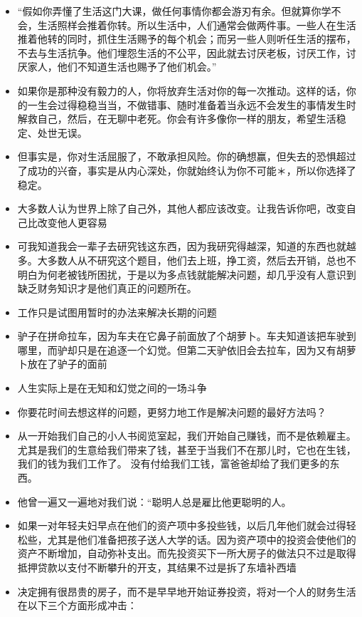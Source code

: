 \documentclass[UTF8,a4paper,8pt]{ctexbook}
\begin{document}
\begin{itemize}
			\item “假如你弄懂了生活这门大课，做任何事情你都会游刃有余。但就算你学不会，生活照样会推着你转。所以生活中，人们通常会做两件事。一些人在生活推着他转的同时，抓住生活赐予的每个机会；而另一些人则听任生活的摆布，不去与生活抗争。他们埋怨生活的不公平，因此就去讨厌老板，讨厌工作，讨厌家人，他们不知道生活也赐予了他们机会。”
			\item 如果你是那种没有毅力的人，你将放弃生活对你的每一次推动。这样的话，你的一生会过得稳稳当当，不做错事、随时准备着当永远不会发生的事情发生时解救自己，然后，在无聊中老死。你会有许多像你一样的朋友，希望生活稳定、处世无误。
			\item 但事实是，你对生活屈服了，不敢承担风险。你的确想赢，但失去的恐惧超过了成功的兴奋，事实是从内心深处，你就始终认为你不可能＊，所以你选择了稳定。
			\item 大多数人认为世界上除了自己外，其他人都应该改变。让我告诉你吧，改变自己比改变他人更容易
			\item 可我知道我会一辈子去研究钱这东西，因为我研究得越深，知道的东西也就越多。大多数人从不研究这个题目，他们去上班，挣工资，然后去开销，总也不明白为何老被钱所困扰，于是以为多点钱就能解决问题，却几乎没有人意识到缺乏财务知识才是他们真正的问题所在。
			\item 工作只是试图用暂时的办法来解决长期的问题
			\item 驴子在拼命拉车，因为车夫在它鼻子前面放了个胡萝卜。车夫知道该把车驶到哪里，而驴却只是在追逐一个幻觉。但第二天驴依旧会去拉车，因为又有胡萝卜放在了驴子的面前
			\item 人生实际上是在无知和幻觉之间的一场斗争
			\item 你要花时间去想这样的问题，更努力地工作是解决问题的最好方法吗？
			\item 从一开始我们自己的小人书阅览室起，我们开始自己赚钱，而不是依赖雇主。尤其是我们的生意给我们带来了钱，甚至于当我们不在那儿时，它也在生钱，我们的钱为我们工作了。 没有付给我们工钱，富爸爸却给了我们更多的东西。
			\item 他曾一遍又一遍地对我们说：“聪明人总是雇比他更聪明的人。
			\item 如果一对年轻夫妇早点在他们的资产项中多投些钱，以后几年他们就会过得轻松些，尤其是他们准备把孩子送人大学的话。因为资产项中的投资会使他们的资产不断增加，自动弥补支出。而先投资买下一所大房子的做法只不过是取得抵押贷款以支付不断攀升的开支，其结果不过是拆了东墙补西墙
			\item 决定拥有很昂贵的房子，而不是早早地开始证券投资，将对一个人的财务生活在以下三个方面形成冲击：
				\begin{enumerate}

\end{enumerate}
\end{itemize}
\end{document}
